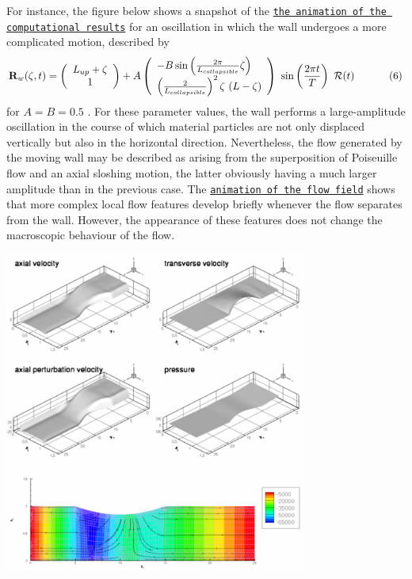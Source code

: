 \begin{DoxyEnumerate}
 For instance, the figure below shows a snapshot of the \href{../figures/large_amplitude_flow.avi}{\tt the animation of the computational results} for an oscillation in which the wall undergoes a more complicated motion, described by \[ {\bf R}_w(\zeta,t) = \left( \begin{array}{c} L_{up} + \zeta \\ 1 \end{array} \right) + A \left( \begin{array}{l} - B \sin\left(\frac{2\pi}{L_{collapsible}}\zeta\right) \\ \left(\frac{2}{L_{collapsible}}\right)^2 \zeta \ (L-\zeta) \end{array} \right) \ \sin\left(\frac{2\pi t}{T}\right) \ {\cal R}(t) \ \ \ \ \ \ \ \ \ \ (6) \] for $ A= B = 0.5 $ . For these parameter values, the wall performs a large-\/amplitude oscillation in the course of which material particles are not only displaced vertically but also in the horizontal direction. Nevertheless, the flow generated by the moving wall may be described as arising from the superposition of Poiseuille flow and an axial sloshing motion, the latter obviously having a much larger amplitude than in the previous case. The \href{../figures/large_amplitude_flow.avi}{\tt animation of the flow field} shows that more complex local flow features develop briefly whenever the flow separates from the wall. However, the appearance of these features does not change the macroscopic behaviour of the flow.  
\begin{DoxyImage}
\includegraphics[width=0.75\textwidth]{large_amplitude_flow}
\end{DoxyImage}

\end{DoxyEnumerate}




